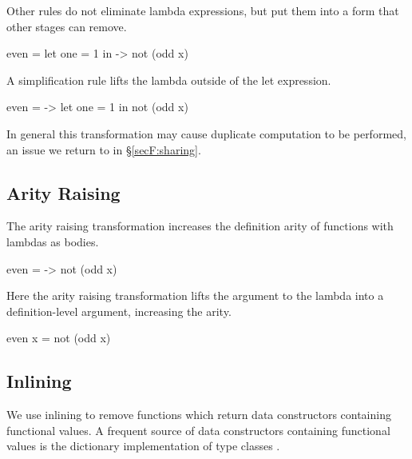 \noindent Other rules do not eliminate lambda expressions, but put them into a form that other stages can remove.

\begin{example}
\begin{code}
even =  let  one = 1
        in   \x -> not (odd x)
\end{code}

\noindent A simplification rule lifts the lambda outside of the let expression.

\begin{code}
even = \x ->  let  one = 1
              in   not (odd x)
\end{code}

\noindent In general this transformation may cause duplicate computation to be performed, an issue we return to in \S\ref{secF:sharing}.
\end{example}


\subsection{Arity Raising}

The arity raising transformation increases the definition arity of functions with lambdas as bodies.

\begin{example}
\begin{code}
even = \x -> not (odd x)
\end{code}

\noindent Here the arity raising transformation lifts the argument to the lambda into a definition-level argument, increasing the arity.

\begin{code}
even x = not (odd x)
\end{code}
\end{example}


\subsection{Inlining}

We use inlining to remove functions which return data constructors containing functional values. A frequent source of data constructors containing functional values is the dictionary implementation of type classes \cite{wadler:type_classes}.

